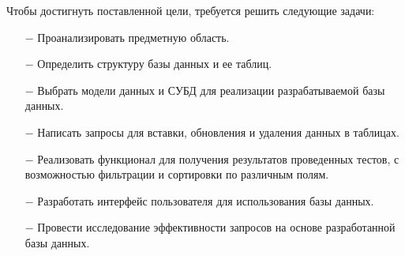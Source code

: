 Чтобы достигнуть поставленной цели, требуется решить следующие задачи: 
\begin{itemize}
    \item[$-$] Проанализировать предметную область.
    \item[$-$] Определить структуру базы данных и ее таблиц.
    \item[$-$] Выбрать модели данных и СУБД для реализации разрабатываемой базы данных.
    \item[$-$] Написать запросы для вставки, обновления и удаления данных в таблицах.
    \item[$-$] Реализовать функционал для получения результатов проведенных тестов, с возможностью фильтрации и сортировки по различным полям.
    \item[$-$] Разработать интерфейс пользователя для использования базы данных. 
    \item[$-$] Провести исследование эффективности запросов на основе разработанной базы данных.
\end{itemize}
